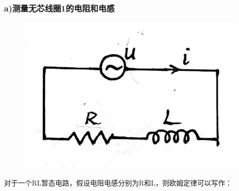 \documentclass[UTF8]{ctexart}
\begin{document}
\subsubsection*{a)测量无芯线圈1的电阻和电感}
\begin{figure}[H]\begin{center}
    \includegraphics*[scale = 0.3]{1.png}
\end{center}\end{figure}
\vspace{-2em}
对于一个RL暂态电路，假设电阻电感分别为R和L，则欧姆定律可以写作：
\end{document}
